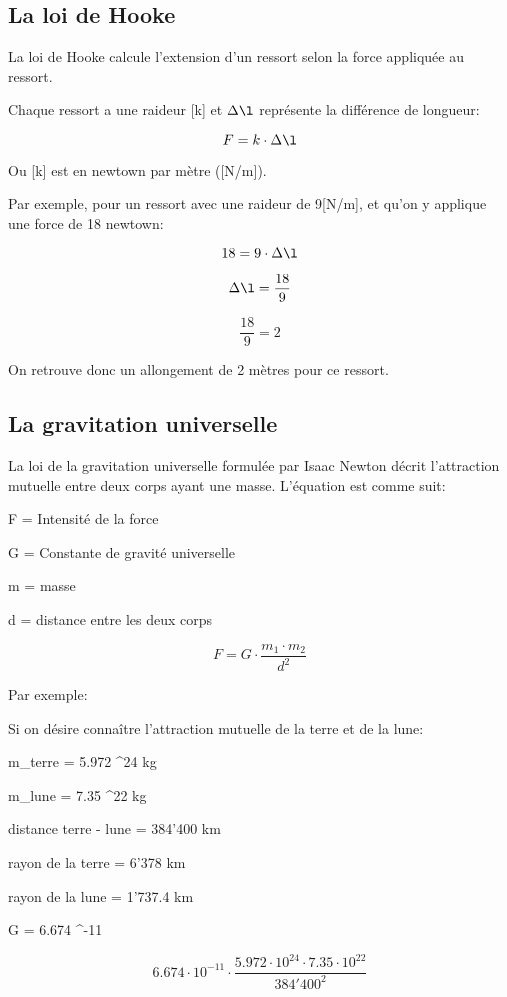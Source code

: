 \documentclass{article}
\begin{document}
\subsection{La loi de Hooke}

La loi de Hooke calcule l'extension d'un ressort selon la force appliquée au ressort.

Chaque ressort a une raideur [k] et \(\Delta\l\) représente la différence de longueur:

\begin{equation}
  F = k \cdot \Delta\l
\end{equation}

Ou [k] est en newtown par mètre ([N/m]).

Par exemple, pour un ressort avec une raideur de 9[N/m], et qu'on y applique une force de 18 newtown:

\begin{equation}
  18 = 9 \cdot \Delta\l
\end{equation}

\begin{equation}
  \Delta\l = \frac{18}{9}
\end{equation}

\begin{equation}
  \frac{18}{9} = 2
\end{equation}

On retrouve donc un allongement de 2 mètres pour ce ressort.

\subsection{La gravitation universelle}

La loi de la gravitation universelle formulée par Isaac Newton décrit l'attraction mutuelle entre deux corps ayant une masse.
\newline
\newline
L'équation est comme suit:

F = Intensité de la force

G = Constante de gravité universelle

m = masse

d = distance entre les deux corps

\begin{equation}
  F = G \cdot \frac{m_1 \cdot m_2}{d^2}
\end{equation}

Par exemple:

Si on désire connaître l'attraction mutuelle de la terre et de la lune:
\newline

m_{terre} = 5.972 ^{24} kg

m_{lune} = 7.35 ^{22} kg

distance terre - lune = 384'400 km

rayon de la terre = 6'378 km

rayon de la lune = 1'737.4 km

G = 6.674 ^{-11}

\begin{equation}
  6.674 \cdot 10^{-11} \cdot \frac{5.972 \cdot 10^{24} \cdot 7.35 \cdot 10^{22}}{384'400^2}
\end{equation}
\end{document}
